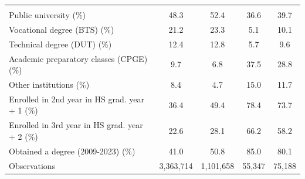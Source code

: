 \begin{table}[!ht]
{\begin{threeparttable}
\begin{tabular}[t]{lcccc}
\addlinespace[\smallskipamount]
\addlinespace[0.3em]
\multicolumn{5}{l}{\textit{\footnotesize Among enrolled:}}\\
\hspace{1em}\hspace{1em}Public university (\%) & 48.3 & 52.4 & 36.6 & 39.7\\
\addlinespace[\smallskipamount]
\hspace{1em}\hspace{1em}Vocational degree (BTS) (\%) & 21.2 & 23.3 & 5.1 & 10.1\\
\addlinespace[\smallskipamount]
\hspace{1em}\hspace{1em}Technical degree (DUT) (\%) & 12.4 & 12.8 & 5.7 & 9.6\\
\addlinespace[\smallskipamount]
\hspace{1em}\hspace{1em}Academic preparatory classes (CPGE) (\%) & 9.7 & 6.8 & 37.5 & 28.8\\
\addlinespace[\smallskipamount]
\hspace{1em}\hspace{1em}Other institutions (\%) & 8.4 & 4.7 & 15.0 & 11.7\\
\addlinespace[\smallskipamount]
\hspace{1em}Enrolled in 2nd year in HS grad. year + 1 (\%) & 36.4 & 49.4 & 78.4 & 73.7\\
\addlinespace[\smallskipamount]
\hspace{1em}Enrolled in 3rd year in HS grad. year + 2 (\%) & 22.6 & 28.1 & 66.2 & 58.2\\
\addlinespace[\smallskipamount]
\hspace{1em}Obtained a degree (2009-2023) (\%) & 41.0 & 50.8 & 85.0 & 80.1\\
\midrule
\addlinespace[\smallskipamount]
Observations & 3,363,714 & 1,101,658 & 55,347 & 75,188\\
\bottomrule
\end{tabular}
\begin{tablenotes}[para]

\end{tablenotes}
\end{threeparttable}}
\end{table}
